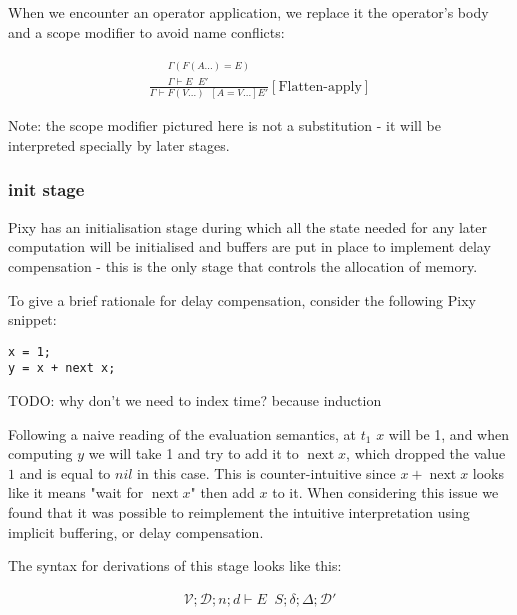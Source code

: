 \documentclass{scrartcl}
\DeclareMathOperator{\nextop}{next}
\DeclareMathOperator{\initrel}{\overset{init}{\Rightarrow}}
\DeclareMathOperator{\flattenrel}{\overset{flatten}{\Rightarrow}}
\begin{document}
    When we encounter an operator application, we replace it the operator's body and a scope modifier to avoid name conflicts:
    
    \begin{align*}
    \frac{
        \begin{matrix}
        \Gamma(F(A...) = E) \\
        \Gamma \vdash E \flattenrel E'
        \end{matrix}
    }{
        \Gamma \vdash F(V...) \flattenrel [A=V...]E'
    }[\text{Flatten-apply}]
    \end{align*}
    
    Note: the scope modifier pictured here is not a substitution - it will be interpreted specially by later stages.
    
    \subsubsection{init stage}
    
    Pixy has an initialisation stage during which all the state needed for any later computation will be initialised and buffers are put in place to implement delay compensation - this is the only stage that controls the allocation of memory.
    
    To give a brief rationale for delay compensation, consider the following Pixy snippet:
    
    \begin{lstlisting}
x = 1;
y = x + next x;
    \end{lstlisting}
    
    TODO: why don't we need to index time? because induction
    
    Following a naive reading of the evaluation semantics, at $t_1$ $x$ will be 1, and when computing $y$ we will take 1 and try to add it to $\nextop x$, which dropped the value $1$ and is equal to $nil$ in this case. This is counter-intuitive since $x + \nextop x$ looks like it means "wait for $\nextop x$" then add $x$ to it. When considering this issue we found that it was possible to reimplement the intuitive interpretation using implicit buffering, or delay compensation.
    
    The syntax for derivations of this stage looks like this:
    
    \begin{align*}
    \mathcal{V}; \mathcal{D}; n; d \vdash E \initrel S; \delta; \Delta; \mathcal{D}'
    \end{align*}
    
\end{document}

